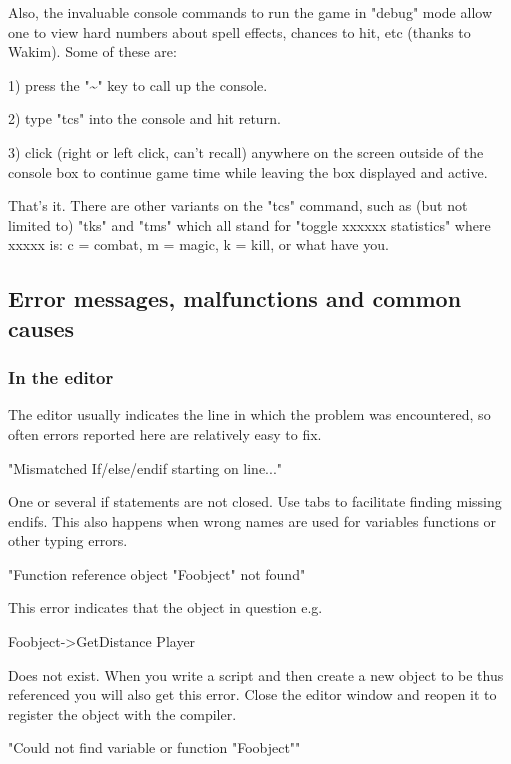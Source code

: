 \documentclass[
]{article}
\begin{document}
Also, the invaluable console commands to run the game in "debug" mode
allow one to view hard numbers about spell effects, chances to hit, etc
(thanks to Wakim). Some of these are:

1) press the "\textasciitilde" key to call up the console.

2) type "tcs" into the console and hit return.

3) click (right or left click, can't recall) anywhere on the screen
outside of the console box to continue game time while leaving the box
displayed and active.

That's it. There are other variants on the "tcs" command, such as (but
not limited to) "tks" and "tms" which all stand for "toggle xxxxxx
statistics" where xxxxx is: c = combat, m = magic, k = kill, or what
have you.

\hypertarget{error-messages-malfunctions-and-common-causes}{%
\subsection{Error messages, malfunctions and common
causes}\label{error-messages-malfunctions-and-common-causes}}

\hypertarget{in-the-editor}{%
\subsubsection{In the editor}\label{in-the-editor}}

The editor usually indicates the line in which the problem was
encountered, so often errors reported here are relatively easy to fix.

"Mismatched If/else/endif starting on line..."

One or several if statements are not closed. Use tabs to facilitate
finding missing endifs. This also happens when wrong names are used for
variables functions or other typing errors.

"Function reference object "Foobject" not found"

This error indicates that the object in question e.g.

Foobject-\textgreater GetDistance Player

Does not exist. When you write a script and then create a new object to
be thus referenced you will also get this error. Close the editor window
and reopen it to register the object with the compiler.

"Could not find variable or function "Foobject""
\end{document}
